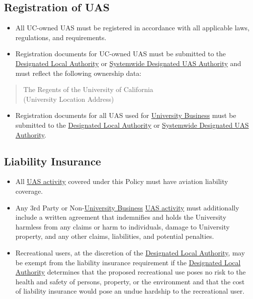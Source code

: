 \documentclass[
]{book}
\providecommand{\tightlist}{%
  \setlength{\itemsep}{0pt}\setlength{\parskip}{0pt}}
\begin{document}
\hypertarget{registration-of-uas}{%
\subsection{Registration of UAS}\label{registration-of-uas}}

\begin{itemize}
\tightlist
\item
  All UC-owned UAS must be registered in accordance with all applicable laws, regulations, and requirements.
\item
  Registration documents for UC-owned UAS must be submitted to the \protect\hyperlink{DLA}{Designated Local Authority} or \protect\hyperlink{SDA}{Systemwide Designated UAS Authority} and must reflect the following ownership data:
\end{itemize}

\begin{quote}
The Regents of the University of California\\
(University Location Address)
\end{quote}

\begin{itemize}
\tightlist
\item
  Registration documents for all UAS used for \protect\hyperlink{UB}{University Business} must be submitted to the \protect\hyperlink{DLA}{Designated Local Authority} or \protect\hyperlink{SDA}{Systemwide Designated UAS Authority}.
\end{itemize}

\hypertarget{liability-insurance}{%
\subsection{Liability Insurance}\label{liability-insurance}}

\begin{itemize}
\tightlist
\item
  All \protect\hyperlink{UASactivity}{UAS activity} covered under this Policy must have aviation liability coverage.
\item
  Any 3rd Party or Non-\protect\hyperlink{UB}{University Business} \protect\hyperlink{UASactivity}{UAS activity} must additionally include a written agreement that indemnifies and holds the University harmless from any claims or harm to individuals, damage to University property, and any other claims, liabilities, and potential penalties.
\item
  Recreational users, at the discretion of the \protect\hyperlink{DLA}{Designated Local Authority}, may be exempt from the liability insurance requirement if the \protect\hyperlink{DLA}{Designated Local Authority} determines that the proposed recreational use poses no risk to the health and safety of persons, property, or the environment and that the cost of liability insurance would pose an undue hardship to the recreational user.
\end{itemize}
\end{document}
